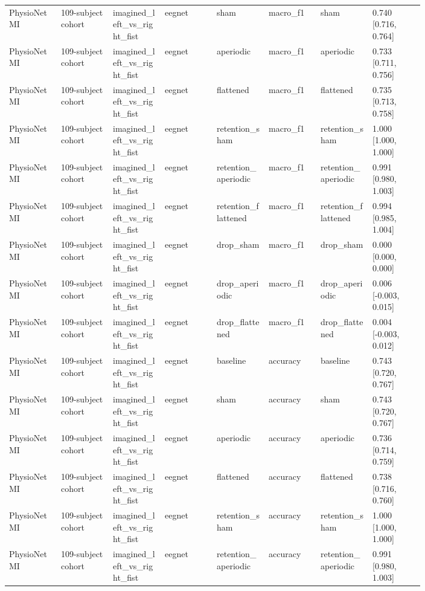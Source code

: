\begin{longtable}{p{0.10\linewidth}p{0.10\linewidth}p{0.10\linewidth}p{0.10\linewidth}p{0.10\linewidth}p{0.10\linewidth}p{0.10\linewidth}p{0.10\linewidth}}
PhysioNet MI & 109-subject cohort & imagined\_left\_vs\_right\_fist & eegnet & sham & macro\_f1 & sham & 0.740 [0.716, 0.764]\\
PhysioNet MI & 109-subject cohort & imagined\_left\_vs\_right\_fist & eegnet & aperiodic & macro\_f1 & aperiodic & 0.733 [0.711, 0.756]\\
PhysioNet MI & 109-subject cohort & imagined\_left\_vs\_right\_fist & eegnet & flattened & macro\_f1 & flattened & 0.735 [0.713, 0.758]\\
PhysioNet MI & 109-subject cohort & imagined\_left\_vs\_right\_fist & eegnet & retention\_sham & macro\_f1 & retention\_sham & 1.000 [1.000, 1.000]\\
PhysioNet MI & 109-subject cohort & imagined\_left\_vs\_right\_fist & eegnet & retention\_aperiodic & macro\_f1 & retention\_aperiodic & 0.991 [0.980, 1.003]\\
PhysioNet MI & 109-subject cohort & imagined\_left\_vs\_right\_fist & eegnet & retention\_flattened & macro\_f1 & retention\_flattened & 0.994 [0.985, 1.004]\\
PhysioNet MI & 109-subject cohort & imagined\_left\_vs\_right\_fist & eegnet & drop\_sham & macro\_f1 & drop\_sham & 0.000 [0.000, 0.000]\\
PhysioNet MI & 109-subject cohort & imagined\_left\_vs\_right\_fist & eegnet & drop\_aperiodic & macro\_f1 & drop\_aperiodic & 0.006 [-0.003, 0.015]\\
PhysioNet MI & 109-subject cohort & imagined\_left\_vs\_right\_fist & eegnet & drop\_flattened & macro\_f1 & drop\_flattened & 0.004 [-0.003, 0.012]\\
PhysioNet MI & 109-subject cohort & imagined\_left\_vs\_right\_fist & eegnet & baseline & accuracy & baseline & 0.743 [0.720, 0.767]\\
PhysioNet MI & 109-subject cohort & imagined\_left\_vs\_right\_fist & eegnet & sham & accuracy & sham & 0.743 [0.720, 0.767]\\
PhysioNet MI & 109-subject cohort & imagined\_left\_vs\_right\_fist & eegnet & aperiodic & accuracy & aperiodic & 0.736 [0.714, 0.759]\\
PhysioNet MI & 109-subject cohort & imagined\_left\_vs\_right\_fist & eegnet & flattened & accuracy & flattened & 0.738 [0.716, 0.760]\\
PhysioNet MI & 109-subject cohort & imagined\_left\_vs\_right\_fist & eegnet & retention\_sham & accuracy & retention\_sham & 1.000 [1.000, 1.000]\\
PhysioNet MI & 109-subject cohort & imagined\_left\_vs\_right\_fist & eegnet & retention\_aperiodic & accuracy & retention\_aperiodic & 0.991 [0.980, 1.003]\\

\end{longtable}
